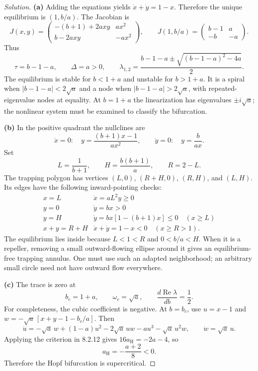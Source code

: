\documentclass[10pt]{amsart}
\newenvironment{solution}
{\begin{proof}[Solution]}
{\end{proof}}
\begin{document}
\begin{onehalfspace}
        \begin{solution}



\textbf{(a)} Adding the equations yields $\dot x+\dot y=1-x$. Therefore the unique equilibrium is $(1,b/a)$. The Jacobian is
\[
 J(x,y)=\begin{pmatrix}-(b+1)+2axy&ax^2\\b-2axy&-ax^2\end{pmatrix},
 \qquad
 J(1,b/a)=\begin{pmatrix}b-1&a\\-b&-a\end{pmatrix}.
\]
Thus
\[
 \tau=b-1-a,\qquad \Delta=a>0,\qquad
 \lambda_{1,2}=\frac{b-1-a\pm\sqrt{(b-1-a)^2-4a}}2.
\]
The equilibrium is stable for $b<1+a$ and unstable for $b>1+a$. It is a spiral when $|b-1-a|<2\sqrt a$ and a node when $|b-1-a|>2\sqrt a$, with repeated-eigenvalue nodes at equality. At $b=1+a$ the linearization has eigenvalues $\pm i\sqrt a$; the nonlinear system must be examined to classify the bifurcation.

\textbf{(b)} In the positive quadrant the nullclines are
\[
 \dot x=0:\quad y=\frac{(b+1)x-1}{ax^2},\qquad
 \dot y=0:\quad y=\frac b{ax}.
\]
Set
\[
 L=\frac1{b+1},\qquad H=\frac{b(b+1)}a,\qquad R=2-L.
\]
The trapping polygon has vertices $(L,0)$, $(R+H,0)$, $(R,H)$, and $(L,H)$. Its edges have the following inward-pointing checks:
\[
\begin{array}{c|c}
 x=L&\dot x=aL^2y\geq0\\
 y=0&\dot y=bx>0\\
 y=H&\dot y=bx[1-(b+1)x]\leq0\quad(x\geq L)\\
 x+y=R+H&\dot x+\dot y=1-x<0\quad(x\geq R>1).
\end{array}
\]
The equilibrium lies inside because $L<1<R$ and $0<b/a<H$. When it is a repeller, removing a small outward-flowing ellipse around it gives an equilibrium-free trapping annulus. One must use such an adapted neighborhood; an arbitrary small circle need not have outward flow everywhere.

\textbf{(c)} The trace is zero at
\[
 b_c=1+a,\qquad \omega_c=\sqrt a,
 \qquad \frac{d\operatorname{Re}\lambda}{db}=\frac12.
\]
For completeness, the cubic coefficient is negative. At $b=b_c$, use $u=x-1$ and $w=-\sqrt a\,[x+y-1-b_c/a]$. Then
\[
 \dot u=-\sqrt a\,w+(1-a)u^2-2\sqrt a\,uw-a u^3-\sqrt a\,u^2w,
 \qquad \dot w=\sqrt a\,u.
\]
Applying the criterion in 8.2.12 gives $16a_{\mathrm H}=-2a-4$, so
\[
 a_{\mathrm H}=-\frac{a+2}{8}<0.
\]
Therefore the Hopf bifurcation is supercritical.


\end{solution}
\end{onehalfspace}
\end{document}
